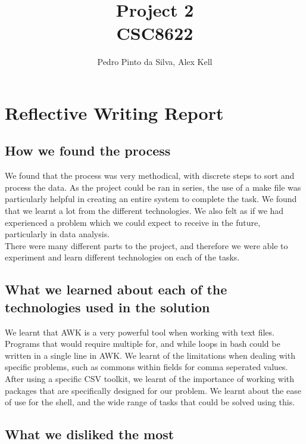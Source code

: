 \documentclass{article}
\begin{document}
\title{Project 2 \\ CSC8622}
\author{Pedro Pinto da Silva, Alex Kell}

\maketitle

\section*{Reflective Writing Report}

\subsection*{How we found the process}

We found that the process was very methodical, with discrete steps to sort and process the data. As the project could be ran in series, the use of a make file was particularly helpful in creating an entire system to complete the task. We found that we learnt a lot from the different technologies. We also felt as if we had experienced a problem which we could expect to receive in the future, particularly in data analysis. \\

There were many different parts to the project, and therefore we were able to experiment and learn different technologies on each of the tasks.

\subsection*{What we learned about each of the technologies used in the solution}

We learnt that AWK is a very powerful tool when working with text files. Programs that would require multiple for, and while loops in bash could be written in a single line in AWK. We learnt of the limitations when dealing with specific problems, such as commons within fields for comma seperated values.  After using a specific CSV toolkit, we learnt of the importance of working with packages that are specifically designed for our problem.  We learnt about the ease of use for the shell, and the wide range of tasks that could be solved using this. 

\subsection*{What we disliked the most}
\end{document}
